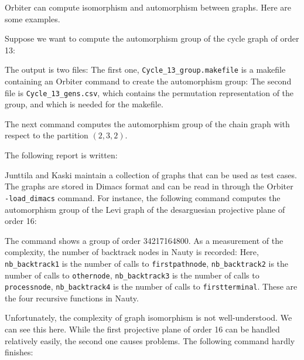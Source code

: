 Orbiter can compute isomorphism and automorphism between graphs. 
Here are some examples.


\bigskip


Suppose we want to compute the automorphism group of the cycle graph of order 13:


The output is two files: The first one, \verb'Cycle_13_group.makefile' is a makefile containing an Orbiter command to 
create the automorphism group:
The second file is \verb'Cycle_13_gens.csv', which contains the permutation representation of the group, and which is needed 
for the makefile.


\bigskip


The next command computes the automorphism group of the chain graph with respect to the partition $(2,3,2)$.


The following report is written:




\bigskip

Junttila and Kaski maintain a collection of graphs that can be used as test cases.
The graphs are stored in Dimacs format and can be read in through 
the Orbiter \verb'-load_dimacs' command. 
For instance, the following command 
computes the automorphism group of the 
Levi graph of the desarguesian projective plane of order 16:


The command shows a group of order 34217164800. 
As a measurement of the complexity, 
the number of backtrack nodes in Nauty is recorded:
Here, 
\verb'nb_backtrack1' is the number of calls to \verb'firstpathnode', 
\verb'nb_backtrack2' is the number of calls to \verb'othernode', 
\verb'nb_backtrack3' is the number of calls to \verb'processnode', 
\verb'nb_backtrack4' is the number of calls to \verb'firstterminal'.
These are the four recursive functions in Nauty.

\bigskip

Unfortunately, the complexity of graph isomorphism is not well-understood. 
We can see this here.
While the first projective plane of order 16 can be handled relatively easily, 
the second one causes problems. The following command hardly finishes:


